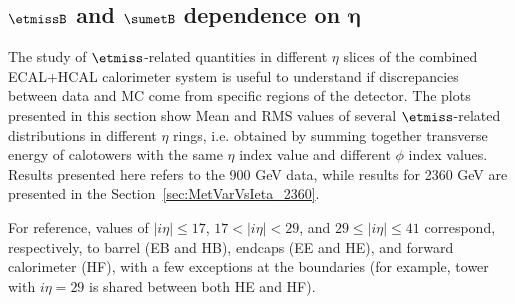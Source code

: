 \clearpage

\subsection[$\etmiss$ and $\sumet$ dependence on $\eta$]{$\etmissB$ and $\sumetB$ dependence on $\boldsymbol{\eta}$} \label{sec:MetVarVsIeta_900}
\label{sec:MetVarVsIeta_900}

The study of $\etmiss$-related quantities in different $\eta$
slices of the combined ECAL+HCAL calorimeter system 
is useful to understand if discrepancies between data and MC 
come from specific regions of the detector.
The plots presented in this section show Mean and RMS values 
of several $\etmiss$-related distributions in different 
$\eta$ rings, i.e. obtained by summing together 
transverse energy of calotowers with the same 
$\eta$ index value and different $\phi$ index values.
Results presented here refers to the 900 GeV data, while results for 2360 GeV
are presented in the Section~\ref{sec:MetVarVsIeta_2360}.

For reference, values of $|i\eta|\le17$, $17<|i\eta|<29$, and $29\le|i\eta|\le41$ 
correspond, respectively, to barrel (EB and HB), endcaps (EE and HE), and forward 
calorimeter (HF), with a few exceptions at the boundaries 
(for example, tower with $i\eta=29$ is shared between both HE and HF).

